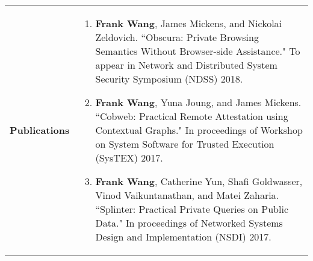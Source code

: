 \documentclass[a4paper,10pt]{article}
\begin{document}
\begin{longtable}{ p{0.9in} l }

\textbf{Publications} & \begin{minipage}[t]{0.78 \textwidth} 
\begin{enumerate}[leftmargin=*]
\setlength{\itemsep}{7pt}
                \setlength{\parskip}{0pt}
                \setlength{\parsep}{0pt}

\item{\textbf{Frank Wang}, James Mickens, and Nickolai Zeldovich. ``Obscura: Private Browsing Semantics Without Browser-side Assistance." To appear in Network and Distributed System Security Symposium (NDSS) 2018.}

\item{\textbf{Frank Wang}, Yuna Joung, and James Mickens. ``Cobweb: Practical Remote Attestation using Contextual Graphs." In proceedings of Workshop on System Software for Trusted Execution (SysTEX) 2017.}

\item{\textbf{Frank Wang}, Catherine Yun, Shafi Goldwasser, Vinod Vaikuntanathan, and Matei Zaharia. ``Splinter: Practical Private Queries on Public Data." In proceedings of Networked Systems Design and Implementation (NSDI) 2017.}


\end{enumerate}
\end{minipage}
\end{longtable}
\end{document}
